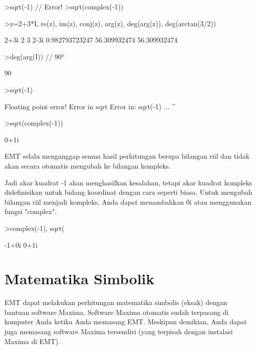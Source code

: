 \documentclass{article}
\newenvironment{eulernotebook}{\par}{\par}
\newcommand{\eulerheading}[1]{\section{#1}}
\newenvironment{eulercomment}{\par\medskip}{\par\medskip}
\begin{document}
\begin{eulernotebook}
\begin{eulercomment}
\end{eulercomment}
\begin{eulerttcomment}
  >sqrt(-1) // Error!
  >sqrt(complex(-1))
\end{eulerttcomment}
\begin{eulerprompt}
>z=2+3*I, re(z), im(z), conj(z), arg(z), deg(arg(z)), deg(arctan(3/2))
\end{eulerprompt}
\begin{euleroutput}
  2+3i
  2
  3
  2-3i
  0.982793723247
  56.309932474
  56.309932474
\end{euleroutput}
\begin{eulerprompt}
>deg(arg(I)) // 90°
\end{eulerprompt}
\begin{euleroutput}
  90
\end{euleroutput}
\begin{eulerprompt}
>sqrt(-1)
\end{eulerprompt}
\begin{euleroutput}
  Floating point error!
  Error in sqrt
  Error in:
  sqrt(-1) ...
          ^
\end{euleroutput}
\begin{eulerprompt}
>sqrt(complex(-1))
\end{eulerprompt}
\begin{euleroutput}
  0+1i
\end{euleroutput}
\begin{eulercomment}
EMT selalu menganggap semua hasil perhitungan berupa bilangan riil dan tidak
akan secara otomatis mengubah ke bilangan kompleks.

Jadi akar kuadrat -1 akan menghasilkan kesalahan, tetapi akar kuadrat kompleks
didefinisikan untuk bidang koordinat dengan cara seperti biasa. Untuk mengubah
bilangan riil menjadi kompleks, Anda dapat menambahkan 0i atau menggunakan
fungsi "complex".
\end{eulercomment}
\begin{eulerprompt}
>complex(-1), sqrt(%
\end{eulerprompt}
\begin{euleroutput}
  -1+0i 
  0+1i
\end{euleroutput}
\eulerheading{Matematika Simbolik}
\begin{eulercomment}
EMT dapat melakukan perhitungan matematika simbolis (eksak) dengan bantuan
software Maxima. Software Maxima otomatis sudah terpasang di komputer Anda ketika
Anda memasang EMT. Meskipun demikian, Anda dapat juga memasang software Maxima
tersendiri (yang terpisah dengan instalasi Maxima di EMT).


\end{eulercomment}
\end{eulernotebook}
\end{document}

